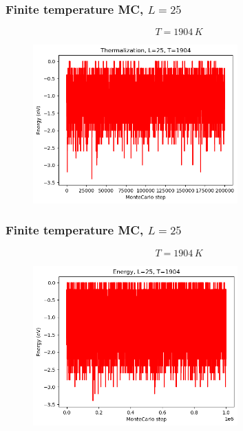 \documentclass{beamer}
\begin{document}
\begin{frame}
    \frametitle{Finite temperature MC, $L=25$}

    $$T=1904\,K$$

    \begin{figure}
        \includegraphics[width=0.7\textwidth]{images/cterm25T1904.png}
    \end{figure}

\end{frame}

\begin{frame}
    \frametitle{Finite temperature MC, $L=25$}

    $$T=1904\,K$$

    \begin{figure}
        \includegraphics[width=0.7\textwidth]{images/cenergy25T1904.png}
    \end{figure}

\end{frame}
\end{document}
